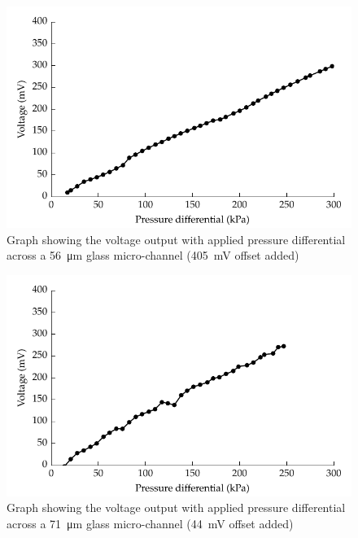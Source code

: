       \begin{figure}
          \centering
          \includegraphics{content/pt1/01-PowerHarvesting/graphics/streamingCell_voltVsPress_56um_out}
          \caption{\label{fig:VvsP_56um}Graph showing the voltage output with applied pressure differential across a \SI{56}{\micro\metre} glass micro-channel (\SI{405}{\milli\volt} offset added)}
      \end{figure}

      \begin{figure}
          \centering
          \includegraphics{content/pt1/01-PowerHarvesting/graphics/streamingCell_voltVsPress_71um_out}
          \caption{\label{fig:VvsP_71um}Graph showing the voltage output with applied pressure differential across a \SI{71}{\micro\metre} glass micro-channel (\SI{44}{\milli\volt} offset added)}
      \end{figure}

